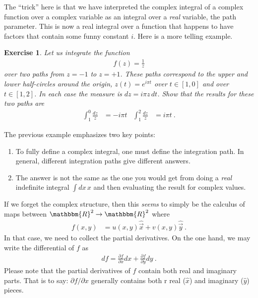\documentclass[
  11pt,
	colorful,
	raggedright,
]{tufte-style-thesis-flip}
\newtheorem{exercise}{Exercise}[section]
\begin{document}
The ``trick'' here is that we have interpreted the complex integral of a complex function over a complex variable as an integral over a \emph{real} variable, the path parameter. This is now a real integral over a function that happens to have factors that contain some funny constant $i$.  Here is a more telling example. 
\begin{exercise}
Let us integrate the function
\begin{align}
  f(z) = \frac{1}{z}
\end{align}
over two paths from $z=-1$ to $z=+1$. These paths correspond to the upper and lower half-circles around the origin, $z(t)= e^{i\pi t} $ over $t\in[1,0]$ and over $t\in[1,2]$. In each case the measure is $dz = i\pi z \, dt$. Show that the results for these two paths are
\begin{align}
  \int_1^0 \frac{dz}{z} &= -i\pi t 
  &
  \int_1^2 \frac{dz}{z} &= i\pi t  \ .
\end{align}
\end{exercise}
The previous example emphasizes two key points:
\begin{enumerate}
  \item To fully define a complex integral, one must define the integration path. In general, different integration paths give different answers. 
  \item The answer is not the same as the one you would get from doing a \emph{real} indefinite integral $\int dx\, x$ and then evaluating the result for complex values.
\end{enumerate}

If we forget the complex structure, then this \emph{seems} to simply be the calculus of maps between $\mathbbm{R}^2 \to \mathbbm{R}^2$ where
\begin{align}
  f(x,y) &= u(x,y) \hat{\vec{x}} + v(x,y)\hat{\vec{y}} \ .
\end{align}
In that case, we need to collect the partial derivatives. On the one hand, we may write the differential of $f$ as
\begin{align}
  df = \frac{\partial f}{\partial x} dx + \frac{\partial f}{\partial y} dy \ .
\end{align}
Please note that the partial derivatives of $f$ contain both real and imaginary parts. That is to say: $\partial f/\partial x$ generally contains both r real ($\hat x$) and imaginary ($\hat y$) pieces. 
\end{document}
